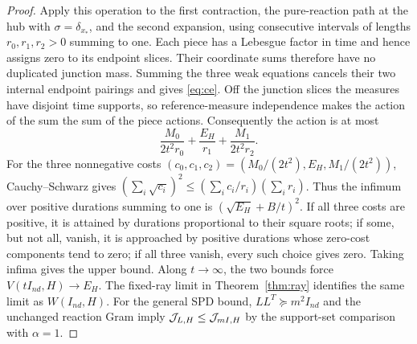\begin{proof}
Apply this operation to the first contraction, the pure-reaction path at
the hub with $\sigma=\delta_{x_*}$, and the second expansion, using
consecutive intervals of lengths $r_0,r_1,r_2>0$ summing to one. Each piece
has a Lebesgue factor in time and hence assigns zero to its endpoint slices.
Their coordinate sums therefore have no duplicated junction mass. Summing
the three weak equations cancels their two internal endpoint pairings and
gives \eqref{eq:ce}. Off the junction slices the measures have disjoint
time supports, so reference-measure independence makes the action of the
sum the sum of the piece actions. Consequently the action is at most
\[
 \frac{M_0}{2t^2r_0}+\frac{E_H}{r_1}+\frac{M_1}{2t^2r_2}.
\]
For the three nonnegative costs
$(c_0,c_1,c_2)=(M_0/(2t^2),E_H,M_1/(2t^2))$, Cauchy--Schwarz gives
$(\sum_i\sqrt{c_i})^2\le(\sum_i c_i/r_i)(\sum_i r_i)$.
Thus the infimum over positive durations summing to one is
$(\sqrt{E_H}+B/t)^2$. If all three costs are positive, it is attained by
durations proportional to their square roots; if some, but not all, vanish,
it is approached by positive durations whose zero-cost components tend to
zero; if all three vanish, every such choice gives zero. Taking infima gives the upper bound. Along $t\to\infty$, the two bounds
force $V(tI_{nd},H)\to E_H$. The fixed-ray limit in
Theorem~\ref{thm:ray} identifies the same limit as $W(I_{nd},H)$.
For the general SPD bound, $LL^T\succeq m^2I_{nd}$ and the unchanged
reaction Gram imply $\mathcal J_{L,H}\le\mathcal J_{mI,H}$ by the support-set
comparison with $\alpha=1$.
\end{proof}
